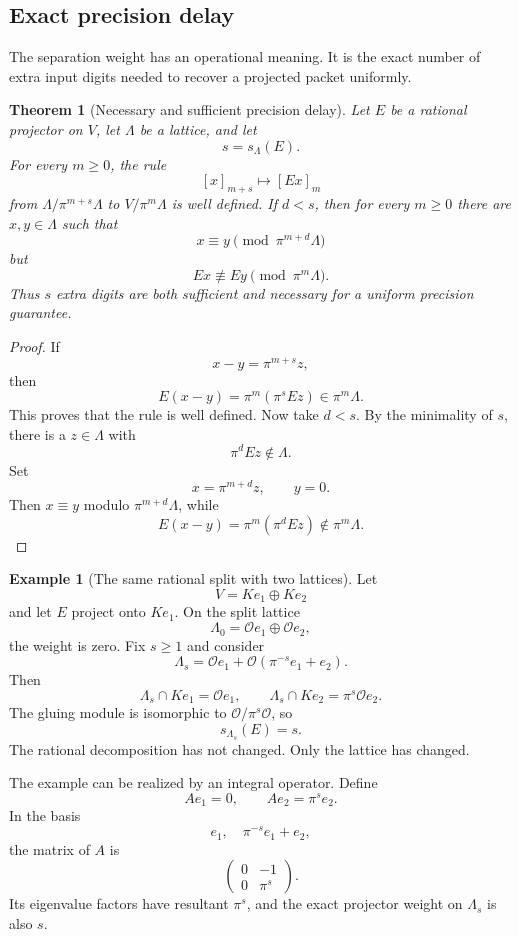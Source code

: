 \documentclass{aomart}
\newtheorem{theorem}{Theorem}[section]
\theoremstyle{definition}
\newtheorem{example}[example]{Example}
\theoremstyle{remark}
\newcommand{\OO}{\mathcal O}
\begin{document}
\subsection{Exact precision delay}

The separation weight has an operational meaning.  It is the exact number of extra input digits needed to recover a projected packet uniformly.

\begin{theorem}[Necessary and sufficient precision delay]\label{thm:precision_delay}
Let $E$ be a rational projector on $V$, let $\Lambda$ be a lattice, and let
\[
s=s_\Lambda(E).
\]
For every $m\geq0$, the rule
\[
[x]_{m+s}\longmapsto[Ex]_m
\]
from $\Lambda/\pi^{m+s}\Lambda$ to $V/\pi^m\Lambda$ is well defined.  If $d<s$, then for every $m\geq0$ there are $x,y\in\Lambda$ such that
\[
x\equiv y\pmod{\pi^{m+d}\Lambda}
\]
but
\[
Ex\not\equiv Ey\pmod{\pi^m\Lambda}.
\]
Thus $s$ extra digits are both sufficient and necessary for a uniform precision guarantee.
\end{theorem}

\begin{proof}
If
\[
x-y=\pi^{m+s}z,
\]
then
\[
E(x-y)=\pi^m(\pi^sEz)\in\pi^m\Lambda.
\]
This proves that the rule is well defined.  Now take $d<s$.  By the minimality of $s$, there is a $z\in\Lambda$ with
\[
\pi^dEz\notin\Lambda.
\]
Set
\[
x=\pi^{m+d}z,
\qquad
y=0.
\]
Then $x\equiv y$ modulo $\pi^{m+d}\Lambda$, while
\[
E(x-y)=\pi^m(\pi^dEz)\notin\pi^m\Lambda.
\]
\end{proof}

\begin{example}[The same rational split with two lattices]\label{ex:lattice_dependence}
Let
\[
V=Ke_1\oplus Ke_2
\]
and let $E$ project onto $Ke_1$.  On the split lattice
\[
\Lambda_0=\OO e_1\oplus\OO e_2,
\]
the weight is zero.  Fix $s\geq1$ and consider
\[
\Lambda_s
=
\OO e_1+
\OO(\pi^{-s}e_1+e_2).
\]
Then
\[
\Lambda_s\cap Ke_1=\OO e_1,
\qquad
\Lambda_s\cap Ke_2=\pi^s\OO e_2.
\]
The gluing module is isomorphic to $\OO/\pi^s\OO$, so
\[
s_{\Lambda_s}(E)=s.
\]
The rational decomposition has not changed.  Only the lattice has changed.
\end{example}

The example can be realized by an integral operator.  Define
\[
Ae_1=0,
\qquad
Ae_2=\pi^se_2.
\]
In the basis
\[
e_1,
\quad
\pi^{-s}e_1+e_2,
\]
the matrix of $A$ is
\[
\begin{pmatrix}
0&-1\\
0&\pi^s
\end{pmatrix}.
\]
Its eigenvalue factors have resultant $\pi^s$, and the exact projector weight on $\Lambda_s$ is also $s$.
\end{document}
